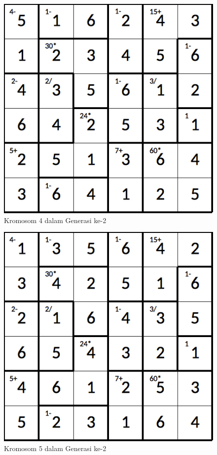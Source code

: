 \begin{figure}
\centering
\captionsetup{justification=centering}
\includegraphics[scale=0.333]{Gambar/hybridgenetic/Generation2Chromosome4}
\caption[Kromosom 4 dalam Generasi ke-2]{Kromosom 4 dalam Generasi ke-2}
\label{fig:analisisg2k4}
\end{figure}

\begin{figure}
\centering
\captionsetup{justification=centering}
\includegraphics[scale=0.333]{Gambar/hybridgenetic/Generation2Chromosome5}
\caption[Kromosom 5 dalam Generasi ke-2]{Kromosom 5 dalam Generasi ke-2}
\label{fig:analisisg2k5}
\end{figure}

